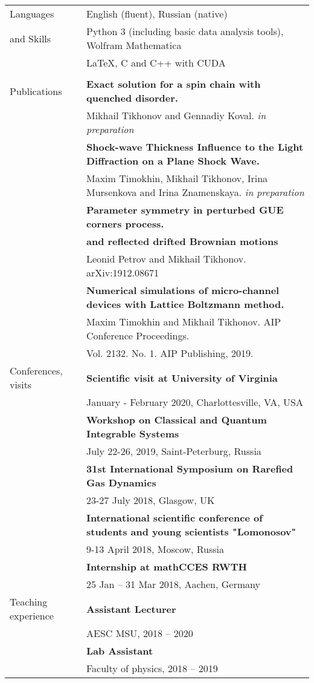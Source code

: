 \documentclass[letterpaper,10pt,oneside,utf8]{article}
\begin{document}
\begin{tabular}{@{} l l}
		\Large{Languages}   & English (fluent), Russian (native) \\
		\Large{and Skills}    	&Python 3 (including basic data analysis tools),  Wolfram Mathematica \\
		& \LaTeX, C and C++ with CUDA\\
		&\\
		\Large{Publications}  
		&\textbf{Exact solution for a spin chain with quenched disorder. }\\&  Mikhail Tikhonov and Gennadiy Koval. \textit{in preparation} \\
		&\textbf{Shock-wave Thickness Influence to the Light Diffraction on a Plane Shock Wave.}\\&
		Maxim Timokhin, Mikhail Tikhonov, Irina Mursenkova and Irina Znamenskaya. \textit{in preparation}\\
		&\textbf{Parameter symmetry in perturbed GUE corners process.	}\\&\textbf{and reflected drifted Brownian motions}\\& Leonid Petrov and  Mikhail Tikhonov. arXiv:1912.08671\\
		&\textbf{Numerical simulations of micro-channel devices with Lattice Boltzmann method. }\\
		&Maxim Timokhin  and Mikhail Tikhonov. AIP Conference Proceedings. \\
		&Vol. 2132. No. 1. AIP Publishing, 2019.\\
		\Large{Conferences, visits} 
		&\textbf{Scientific visit at University of Virginia}\\
		& January - February 2020, Charlottesville, VA, USA  \\
		&\textbf{Workshop on Classical and Quantum Integrable Systems}\\
		&July 22-26, 2019, Saint-Peterburg, Russia\\
		& \textbf{31st International Symposium on Rarefied Gas Dynamics}\\
		& 23-27 July 2018, Glasgow, UK\\
		&\textbf{International scientific conference of students and young scientists "Lomonosov"}\\
		& 9-13 April 2018,  Moscow, Russia\\
		&\textbf{Internship at mathCCES RWTH}\\
		& 25 Jan -- 31 Mar 2018, Aachen, Germany \\

		\Large{Teaching experience}&
		\textbf{Assistant Lecturer}\\
		&AESC MSU, 2018 -- 2020\\
		&\textbf{Lab Assistant}\\
		&Faculty of physics, 2018 -- 2019\\

		
		
	\end{tabular}
	
\end{document}
